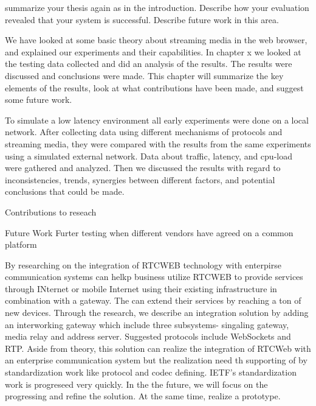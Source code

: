

summarize your thesis again as in the introduction.
Describe how your evaluation revealed that your system is successful.
Describe future work in this area.

We have looked at some basic theory about streaming media in the web browser, and explained our experiments and their capabilities. In chapter x we looked at the testing data collected and did an analysis of the results. The results were discussed and conclusions were made. This chapter will summarize the key elements of the results, look at what contributions have been made, and suggest some future work.


To simulate a low latency environment all early experiments were done on a local network. After collecting data using different mechanisms of protocols and streaming media, they were compared with the results from the same experiments using a simulated external network. Data about traffic, latency, and cpu-load were gathered and analyzed. Then we discussed the results with regard to inconsistencies, trends, synergies between different factors, and potential conclusions that could be made.

Contributions to reseach

Future Work
Furter testing when different vendors have agreed on a common platform





By researching on the integration of RTCWEB technology with enterpirse communication systems can helkp business utilize RTCWEB to provide services through INternet or mobile Internet using their existing infrastructure in combination with a gateway. The can extend their services by reaching a ton of new devices. 
Through the research, we describe an integration solution by adding an interworking gateway which include three subsystems- singaling gateway, media relay and address server. Suggested protocols include WebSockets and RTP.
Aside from theory, this solution can realize the integration of RTCWeb with an enterprise communication system but the realization need th supporting of by standardization work like protocol and codec defining. IETF's standardization work is progreseed very quickly. In the the future, we will focus on the progressing and refine the solution. At the same time, realize a prototype.